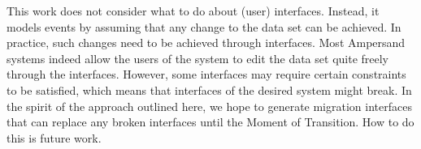 \documentclass[runningheads]{llncs}
\begin{document}
   This work does not consider what to do about (user) interfaces.
   Instead, it models events by assuming that any change to the data set can be achieved.
   In practice, such changes need to be achieved through interfaces.
   Most Ampersand systems indeed allow the users of the system to edit the data set quite freely through the interfaces.
   However, some interfaces may require certain constraints to be satisfied, which means that interfaces of the desired system might break.
   In the spirit of the approach outlined here, we hope to generate migration interfaces that can replace any broken interfaces until the Moment of Transition.
   How to do this is future work.



\end{document}
